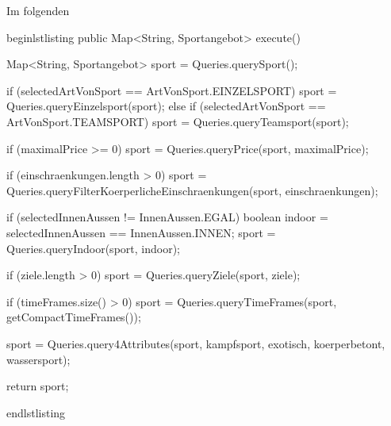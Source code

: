 Im folgenden 

		


begin{lstlisting}
    public Map<String, Sportangebot> execute() {
        Map<String, Sportangebot> sport = Queries.querySport();

        if (selectedArtVonSport == ArtVonSport.EINZELSPORT) {
            sport = Queries.queryEinzelsport(sport);
        } else if (selectedArtVonSport == ArtVonSport.TEAMSPORT) {
            sport = Queries.queryTeamsport(sport);
        }

        if (maximalPrice >= 0) {
            sport = Queries.queryPrice(sport, maximalPrice);
        }

        if (einschraenkungen.length > 0) {
            sport = Queries.queryFilterKoerperlicheEinschraenkungen(sport,
                                                                   einschraenkungen);
        }

        if (selectedInnenAussen != InnenAussen.EGAL) {
            boolean indoor = selectedInnenAussen == InnenAussen.INNEN;
            sport = Queries.queryIndoor(sport, indoor);
        }

        if (ziele.length > 0) {
            sport = Queries.queryZiele(sport, ziele);
        }

        if (timeFrames.size() > 0) {
            sport = Queries.queryTimeFrames(sport, getCompactTimeFrames());
        }

        sport = Queries.query4Attributes(sport, kampfsport, exotisch, koerperbetont, wassersport);

        return sport;

    }

end{lstlisting}


